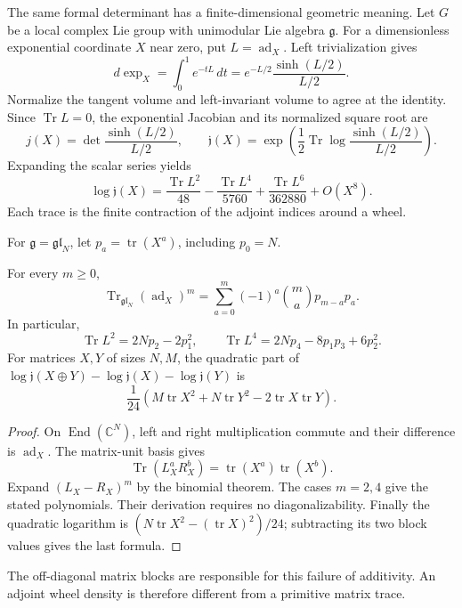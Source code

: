 The same formal determinant has a finite-dimensional
geometric meaning. Let $G$ be a local complex Lie group
with unimodular Lie algebra $\mathfrak g$.
For a dimensionless exponential coordinate $X$ near zero,
put $L=\operatorname{ad}_X$.
Left trivialization gives
\[
 d\exp_X=\int_0^1e^{-tL}\,dt
       =e^{-L/2}\frac{\sinh(L/2)}{L/2}.
\]
Normalize the tangent volume and left-invariant volume
to agree at the identity.
Since $\operatorname{Tr}L=0$, the exponential Jacobian
and its normalized square root are
\[
 j(X)=\det\frac{\sinh(L/2)}{L/2},
 \qquad
 \mathfrak j(X)=
 \exp\left(\frac12\operatorname{Tr}
                  \log\frac{\sinh(L/2)}{L/2}\right).
\]
Expanding the scalar series yields
\begin{equation}\label{eq:vol2-log-wheel-coefficients}
 \log\mathfrak j(X)
 =\frac{\operatorname{Tr}L^2}{48}
  -\frac{\operatorname{Tr}L^4}{5760}
  +\frac{\operatorname{Tr}L^6}{362880}
  +O(X^8).
\end{equation}
Each trace is the finite contraction of the adjoint
indices around a wheel.

For $\mathfrak g=\mathfrak{gl}_N$, let
$p_a=\operatorname{tr}(X^a)$, including $p_0=N$.

\begin{proposition}\label{prop:vol2-matrix-wheel-traces}
For every $m\geq0$,
\[
 \operatorname{Tr}_{\mathfrak{gl}_N}(\operatorname{ad}_X)^m
 =\sum_{a=0}^m(-1)^a\binom ma p_{m-a}p_a.
\]
In particular,
\[
 \operatorname{Tr}L^2=2Np_2-2p_1^2,\qquad
 \operatorname{Tr}L^4=2Np_4-8p_1p_3+6p_2^2.
\]
For matrices $X,Y$ of sizes $N,M$, the quadratic part of
$\log\mathfrak j(X\oplus Y)-\log\mathfrak j(X)
 -\log\mathfrak j(Y)$ is
\[
 \frac1{24}
 \left(M\operatorname{tr}X^2+N\operatorname{tr}Y^2
             -2\operatorname{tr}X\operatorname{tr}Y\right).
\]
\end{proposition}
\begin{proof}
On $\operatorname{End}(\mathbb C^N)$, left and right
multiplication commute and their difference is
$\operatorname{ad}_X$.
The matrix-unit basis gives
\[
 \operatorname{Tr}(L_X^aR_X^b)
    =\operatorname{tr}(X^a)\operatorname{tr}(X^b).
\]
Expand $(L_X-R_X)^m$ by the binomial theorem.
The cases $m=2,4$ give the stated polynomials.
Their derivation requires no diagonalizability.
Finally the quadratic logarithm is
$(N\operatorname{tr}X^2-(\operatorname{tr}X)^2)/24$;
subtracting its two block values gives the last formula.
\end{proof}

The off-diagonal matrix blocks are responsible for
this failure of additivity. An adjoint wheel density
is therefore different from a primitive matrix trace.

